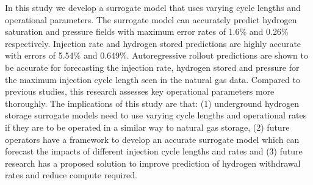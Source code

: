 In this study we develop a surrogate model that uses varying cycle lengths and operational parameters. The surrogate model can accurately predict hydrogen saturation and pressure fields with maximum error rates of 1.6\% and 0.26\% respectively. Injection rate and hydrogen stored predictions are highly accurate with errors of 5.54\% and 0.649\%. Autoregressive rollout predictions are shown to be accurate for forecasting the injection rate, hydrogen stored and pressure for the maximum injection cycle length seen in the natural gas data. Compared to previous studies, this research assesses key operational parameters more thoroughly. The implications of this study are that: (1) underground hydrogen storage surrogate models need to use varying cycle lengths and operational rates if they are to be operated in a similar way to natural gas storage, (2) future operators have a framework to develop an accurate surrogate model which can forecast the impacts of different injection cycle lengths and rates and (3) future research has a proposed solution to improve prediction of hydrogen withdrawal rates and reduce compute required. 

